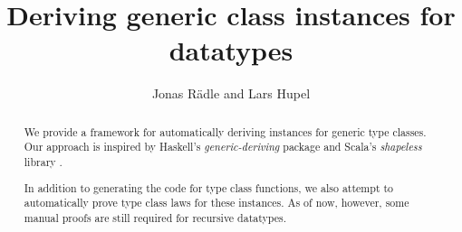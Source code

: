 \documentclass[11pt,a4paper]{article}
\begin{document}
\title{Deriving generic class instances for datatypes}
\author{Jonas Rädle and Lars Hupel}
\maketitle

\begin{abstract}
We provide a framework for automatically deriving instances for generic type classes. Our approach is inspired by
Haskell's \textit{generic-deriving} package \cite{magalhaes2010generic} and Scala's \textit{shapeless} library \cite{shapeless2018}.

In addition to generating the code for type class functions, we also attempt to automatically prove type class laws for these instances. 
As of now, however, some manual proofs are still required for recursive datatypes.
\end{abstract}

\tableofcontents





\end{document}
